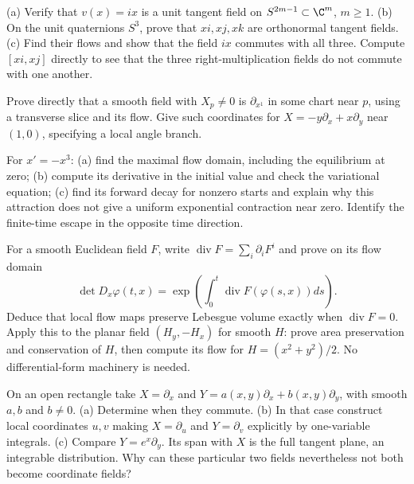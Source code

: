 \begin{exercise}[$\star$]\label{ex:hairyodd}
(a) Verify that $v(x)=ix$ is a unit tangent field on $S^{2m-1}\subset\C^m$, $m\ge1$.
(b) On the unit quaternions $S^3$, prove that $xi,xj,xk$ are orthonormal tangent fields.
(c) Find their flows and show that the field $ix$ commutes with all three. Compute $[xi,xj]$ directly to see that the three right-multiplication fields do not commute with one another.
\end{exercise}

\begin{exercise}[$\star\star$]\label{ex:straighten}
Prove directly that a smooth field with $X_p\ne0$ is $\partial_{x^1}$ in some chart near $p$, using a transverse slice and its flow. Give such coordinates for $X=-y\partial_x+x\partial_y$ near $(1,0)$, specifying a local angle branch.
\end{exercise}

\begin{exercise}[$\star\star$]\label{ex:v9-ch02-nonlinear-decay}
For $x'=-x^3$:
(a) find the maximal flow domain, including the equilibrium at zero;
(b) compute its derivative in the initial value and check the variational equation;
(c) find its forward decay for nonzero starts and explain why this attraction does not give a uniform exponential contraction near zero. Identify the finite-time escape in the opposite time direction.
\end{exercise}

\begin{exercise}[$\star\star$]\label{ex:v9-ch02-volume-jacobian}
For a smooth Euclidean field $F$, write $\operatorname{div}F=\sum_i\partial_iF^i$ and prove on its flow domain
\[
\det D_x\varphi(t,x)=\exp\left(\int_0^t\operatorname{div}F(\varphi(s,x))ds\right).
\]
Deduce that local flow maps preserve Lebesgue volume exactly when $\operatorname{div}F=0$. Apply this to the planar field $(H_y,-H_x)$ for smooth $H$: prove area preservation and conservation of $H$, then compute its flow for $H=(x^2+y^2)/2$. No differential-form machinery is needed.
\end{exercise}

\begin{exercise}[$\star\star$]\label{ex:v9-ch02-simultaneous-coordinates}
On an open rectangle take $X=\partial_x$ and $Y=a(x,y)\partial_x+b(x,y)\partial_y$, with smooth $a,b$ and $b\ne0$.
(a) Determine when they commute.
(b) In that case construct local coordinates $u,v$ making $X=\partial_u$ and $Y=\partial_v$ explicitly by one-variable integrals.
(c) Compare $Y=e^x\partial_y$. Its span with $X$ is the full tangent plane, an integrable distribution. Why can these particular two fields nevertheless not both become coordinate fields?
\end{exercise}

